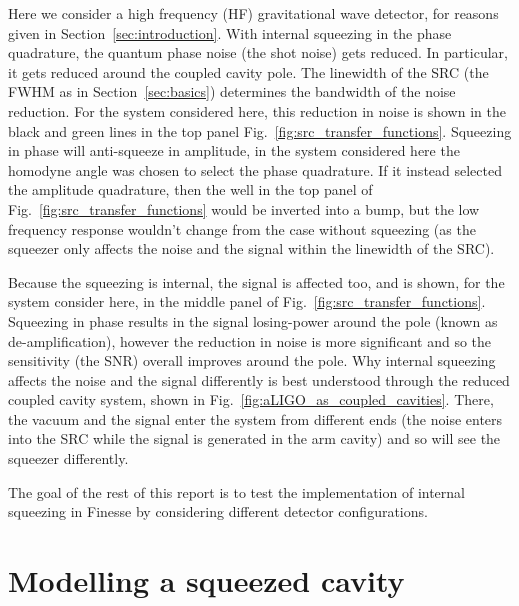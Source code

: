 \documentclass[aps,pra,superscriptaddress,reprint,nofootinbib]{revtex4-1}
\begin{document}
Here we consider a high frequency (HF) gravitational wave detector, for reasons given in Section~\ref{sec:introduction}. With internal squeezing in the phase quadrature, the quantum phase noise (the shot noise) gets reduced. In particular, it gets reduced around the coupled cavity pole. The linewidth of the SRC (the FWHM as in Section~\ref{sec:basics}) determines the bandwidth of the noise reduction. For the system considered here, this reduction in noise is shown in the black and green lines in the top panel Fig.~\ref{fig:src_transfer_functions}.
Squeezing in phase will anti-squeeze in amplitude, in the system considered here the homodyne angle was chosen to select the phase quadrature. If it instead selected the amplitude quadrature, then the well in the top panel of Fig.~\ref{fig:src_transfer_functions} would be inverted into a bump, but the low frequency response wouldn’t change from the case without squeezing (as the squeezer only affects the noise and the signal within the linewidth of the SRC).

Because the squeezing is internal, the signal is affected too, and is shown, for the system consider here, in the middle panel of Fig.~\ref{fig:src_transfer_functions}. Squeezing in phase results in the signal losing-power around the pole (known as de-amplification), however the reduction in noise is more significant and so the sensitivity (the SNR) overall improves around the pole.
Why internal squeezing affects the noise and the signal differently is best understood through the reduced coupled cavity system, shown in Fig.~\ref{fig:aLIGO_as_coupled_cavities}. There, the vacuum and the signal enter the system from different ends (the noise enters into the SRC while the signal is generated in the arm cavity) and so will see the squeezer differently.


The goal of the rest of this report is to test the implementation of internal squeezing in Finesse by considering different detector configurations.


\section{Modelling a squeezed cavity} %
\label{sec:sqzcavity}
\end{document}
